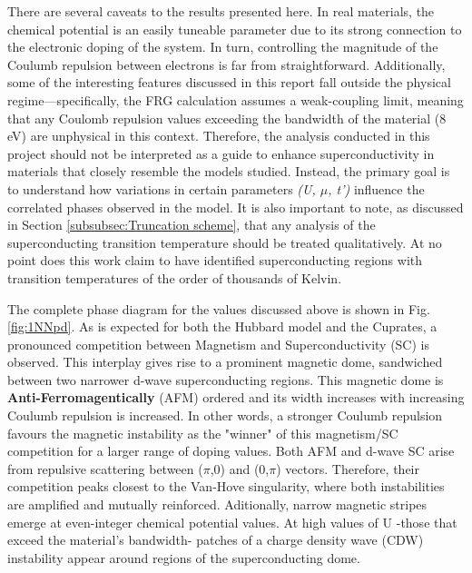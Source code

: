 \documentclass[12pt]{article}
\begin{document}
\noindent There are several caveats to the results presented here. In real materials,  the chemical potential is an easily tuneable parameter due to its strong connection to the electronic doping of the system.
In turn, controlling the magnitude of the Coulumb repulsion between electrons is far from straightforward. 
Additionally, some of the interesting features discussed in this report fall outside the physical regime—specifically, the FRG calculation assumes a weak-coupling limit, meaning that any Coulomb 
repulsion values exceeding the bandwidth of the material (8 eV) are unphysical in this context.
Therefore, the analysis conducted in this project should not be interpreted as a guide to enhance superconductivity in materials that closely resemble the models studied.
Instead, the primary goal is to understand how variations in certain parameters \textit{(U, $\mu$, t')} influence the correlated phases observed in the model. 
It is also important to note, as discussed in Section \ref{subsubsec:Truncation scheme}, that any analysis of the 
superconducting transition temperature should be treated qualitatively. At no point does this work claim to have identified superconducting 
regions with transition temperatures of the order of thousands of Kelvin.


\medskip
\noindent The complete phase diagram for the values discussed above is shown in Fig.\ref{fig:1NNpd}. As is expected
for both the Hubbard model and the Cuprates\cite{kivelson1998electronic,fradkin2015colloquium,vanhala2018dynamical}, a pronounced competition between Magnetism and 
Superconductivity (SC) is observed. This interplay gives rise to a prominent magnetic dome, sandwiched between two narrower d-wave superconducting regions. This magnetic dome is 
\textbf{Anti-Ferromagentically} (AFM) ordered and its width increases with increasing Coulumb repulsion is increased. In other words, a stronger Coulumb repulsion favours the magnetic instability as the "winner" of this magnetism/SC competition 
for a larger range of doping values. Both AFM and d-wave SC arise from repulsive scattering between
($\pi$,0) and (0,$\pi$) vectors. Therefore, their competition peaks closest to the Van-Hove singularity, where both instabilities are amplified and mutually reinforced\cite{furukawa1998truncation,honerkamp2001temperature}.
Aditionally, narrow magnetic stripes emerge at even-integer chemical potential values. At high values of U -those that exceed the material's bandwidth- patches of a charge density wave (CDW) instability appear around regions of the superconducting dome.\par
\end{document}
